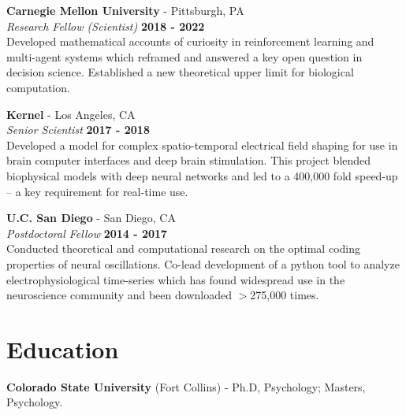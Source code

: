 \documentclass[margin,line]{res}
\begin{document}
\begin{resume}
\vspace{-.1cm}
{\bf Carnegie Mellon University} - Pittsburgh, PA\\
{\em Research Fellow (Scientist)} \hfill {\bf 2018 - 2022}\\
Developed mathematical accounts of curiosity in reinforcement learning and multi-agent systems which reframed and answered a key open question in decision science. Established a new theoretical upper limit for biological computation. 

\vspace{-.1cm}
{\bf Kernel} - Los Angeles, CA\\
{\em Senior Scientist} \hfill {\bf 2017 - 2018}\\
Developed a model for complex spatio-temporal electrical field shaping for use in brain computer interfaces and deep brain stimulation. This project blended biophysical models with deep neural networks and led to a 400,000 fold speed-up -- a key requirement for real-time use.

\vspace{-.1cm}
{\bf U.C. San Diego} - San Diego, CA\\
{\em Postdoctoral Fellow} \hfill {\bf 2014 - 2017}\\
Conducted theoretical and computational research on the optimal coding properties of neural oscillations. Co-lead development of a python tool to analyze electrophysiological time-series which has found widespread use in the neuroscience community and been downloaded $>$275,000 times.



\vspace{-.2cm}
\section{\sc Education}
{\bf Colorado State University} (Fort Collins) - Ph.D, Psychology; Masters, Psychology.\\
\vspace*{-.15in}


\end{resume}
\end{document}
